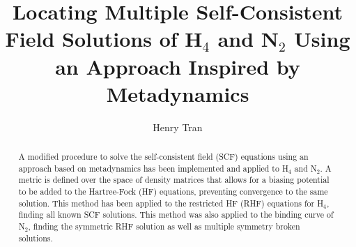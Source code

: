 \documentclass[final,3p,times,twocolumn]{elsarticle}
\begin{document}
\begin{frontmatter}



\title{Locating Multiple Self-Consistent Field Solutions of H$_4$ and N$_2$ Using an Approach Inspired by Metadynamics}


\author{Henry Tran}

\address{Department of Chemistry, Lensfield Road, Cambridge, UK,
CB2 1EW}

\begin{abstract}
A modified procedure to solve the self-consistent field (SCF) equations using an approach based on metadynamics has been implemented and applied to H$_4$ and N$_2$. A metric is defined over the space of density matrices that allows for a biasing potential to be added to the Hartree-Fock (HF) equations, preventing convergence to the same solution. This method has been applied to the restricted HF (RHF) equations for H$_4$, finding all known SCF solutions. This method was also applied to the binding curve of N$_2$, finding the symmetric RHF solution as well as multiple symmetry broken solutions.
\end{abstract}

\end{frontmatter}


\end{document}
